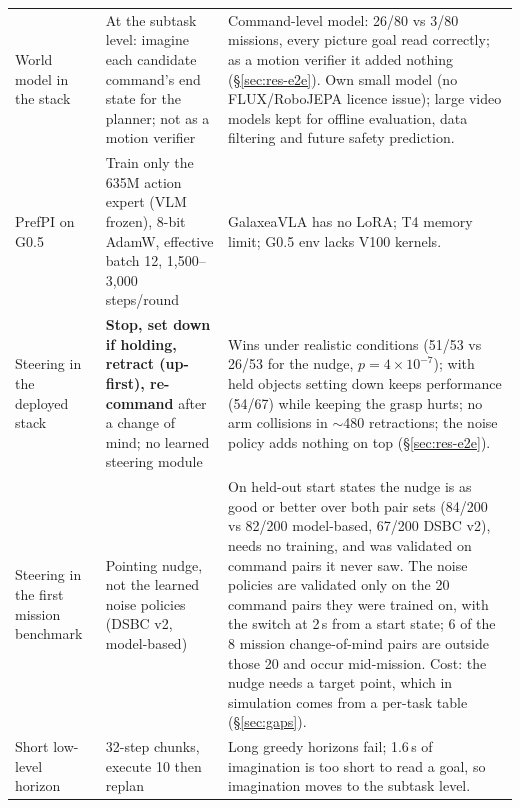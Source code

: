 \documentclass[10pt,a4paper]{article}
\begin{document}
\begin{small}
\begin{longtable}{@{}P{3.6cm}P{5.4cm}P{6.6cm}@{}}
World model in the stack & At the subtask level: imagine each candidate command's end state for the planner; not as a motion verifier & Command-level model: 26/80 vs 3/80 missions, every picture goal read correctly; as a motion verifier it added nothing (\S\ref{sec:res-e2e}). Own small model (no FLUX/RoboJEPA licence issue); large video models kept for offline evaluation, data filtering and future safety prediction. \\
PrefPI on G0.5 & Train only the 635M action expert (VLM frozen), 8-bit AdamW, effective batch 12, 1,500--3,000 steps/round & GalaxeaVLA has no LoRA; T4 memory limit; G0.5 env lacks V100 kernels. \\
Steering in the deployed stack & \textbf{Stop, set down if holding, retract (up-first), re-command} after a change of mind; no learned steering module & Wins under realistic conditions (51/53 vs 26/53 for the nudge, $p=4\times10^{-7}$); with held objects setting down keeps performance (54/67) while keeping the grasp hurts; no arm collisions in $\sim$480 retractions; the noise policy adds nothing on top (\S\ref{sec:res-e2e}). \\
Steering in the first mission benchmark & Pointing nudge, not the learned noise policies (DSBC v2, model-based) & On held-out start states the nudge is as good or better over both pair sets (84/200 vs 82/200 model-based, 67/200 DSBC v2), needs no training, and was validated on command pairs it never saw. The noise policies are validated only on the 20 command pairs they were trained on, with the switch at 2\,s from a start state; 6 of the 8 mission change-of-mind pairs are outside those 20 and occur mid-mission. Cost: the nudge needs a target point, which in simulation comes from a per-task table (\S\ref{sec:gaps}). \\
Short low-level horizon & 32-step chunks, execute 10 then replan & Long greedy horizons fail; 1.6\,s of imagination is too short to read a goal, so imagination moves to the subtask level. \\
\bottomrule
\end{longtable}
\end{small}

\end{document}
